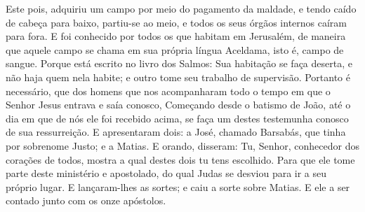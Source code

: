 {  Este pois, adquiriu um campo por meio do pagamento da maldade, e tendo caído de cabeça para baixo, partiu-se ao meio, e todos os seus órgãos internos caíram para fora.
  E
{} foi conhecido por todos os que habitam em Jerusalém, de maneira que aquele campo se chama em sua própria língua Aceldama, isto é, campo de sangue.
  Porque está escrito no livro dos Salmos: Sua habitação se faça deserta, e não haja quem nela habite; e outro tome seu trabalho de supervisão.
  Portanto é necessário, que dos homens que nos acompanharam todo o tempo em que o Senhor Jesus entrava e saía conosco,
  Começando desde o batismo de João, até o dia em que
{} de nós ele foi recebido acima, se faça um destes testemunha conosco de sua ressurreição.
  E apresentaram dois: a José, chamado Barsabás, que tinha por sobrenome
{} Justo; e a Matias.
  E orando, disseram: Tu, Senhor, conhecedor dos corações de todos, mostra a qual destes dois tu tens escolhido.
  Para que ele tome parte deste ministério e apostolado, do qual Judas se desviou para ir a seu próprio lugar.
  E lançaram-lhes as sortes; e caiu a sorte sobre Matias. E ele
{} a ser contado junto com os onze apóstolos.
\par }

